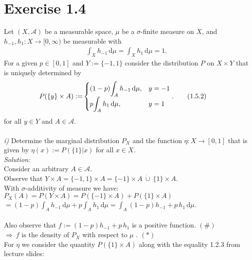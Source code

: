 \documentclass{article}
\begin{document}
\section*{Exercise 1.4}
Let $(X,\mathcal{A})$ be a measurable space, $\mu$ be a $\sigma$-finite measure on $X$, and $h_{-1}, h_1:X \rightarrow [0,\infty)$ be measurable with 
\begin{align*}
\displaystyle{ \int_{X} h_{-1} \, \text{d}\mu = \int_{X} h_{1} \, \text{d}\mu = 1. } \tag{1.5.1}
\end{align*}
For a given $p\in [0,1]$ and $Y:= \{ -1,1 \}$ consider the distribution $P$ on $X \times Y$ that is uniquely determined by 
\begin{align*}
P(\{ y \} \times A) := 
 & \begin{cases} 
 (1-p)\displaystyle{\int_A h_{-1} \, \text{d}\mu }, & y = -1 \cr  
 p \displaystyle{\int_A h_{1} \, \text{d}\mu }, &y = 1 
\end{cases}. \tag{1.5.2}
\end{align*}
for all $y\in Y$ and $A\in \mathcal{A}$.\\
\\
\textsl{i)} Determine the marginal distribution $P_X$ and the function $\eta:X\rightarrow [0,1]$ that is given by $\eta(x):=P(\{ 1 \}| x)$ for all $x\in X$. \vspace{0.5em}\\
\textsl{Solution:} \\
Consider an arbitrary $A\in\mathcal{A}$. \\
Observe that $Y\times A = \{ -1,1 \} \times A = \{-1\} \times A \ \dot{\cup} \ \{1\} \times A $. \\
With $\sigma$-additivity of measure we have: \\
\indent $P_X(A) = P(Y\times A) =  P( \{-1\} \times A )+P( \{1\} \times A) $ \\
\indent \hspace*{3.1cm}$= \displaystyle{ (1-p)\int_A h_{-1} \,\text{d}\mu + p\int_A h_{1}\, \text{d}\mu = \int_A (1-p)h_{-1}+p\, h_{1}\, \text{d}\mu } $.\\
\vspace*{-1em} \\
Also observe that $f:=(1-p)h_{-1}+p\, h_{1}$ is a positive function. \hspace{4.8cm}$ (\#)$\\
$\Rightarrow \ f$ is the density of $P_X$ with respect to $\mu$ . \hspace{7.6cm}$ (*)$ \\
For $\eta$ we consider the quantity $P(\{ 1\} \times A)$ along with the equality 1.2.3 from lecture slides:\\
\end{document}

